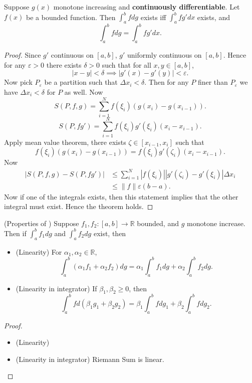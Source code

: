 \begin{theorem}
	Suppose $g(x)$ monotone increasing and \textbf{continuously differentiable}. Let $f(x)$ be a bounded function. Then $\int_a^b f dg $ exists iff $\int_a^b f g' dx$ exists, and 
	\[
		\int_a^b f dg  = \int_a^b f g' dx
	.\] 
\end{theorem}
\begin{proof}
	Since $g'$ continuous on $[a,b]$, $g'$ uniformly continuous on $[a,b]$. Hence for any $\varepsilon>0$ there exists $\delta>0$ such that for all $x, y \in [a,b]$,
	\[
		\left| x - y \right| < \delta \implies
		\left| g'(x) - g'(y) \right| <\varepsilon 
	.\] 
	Now pick $P_\varepsilon$ be a partition such that $\Delta x_i < \delta$. Then for any $P  $ finer than $P_\varepsilon$ we have $\Delta x_i<\delta$ for $P$ as well. Now
	\[
		S(P, f, g) = \sum_{i=1}^{N} f(\xi_i) \left( g(x_i) - g(x_{i-1 }) \right) 
	.\] 
\[
		S(P, fg') = \sum_{i=1}^{N} f(\xi_i)g'(\xi_i) \left( x_i - x_{i-1 } \right) 
	.\]
	Apply mean value theorem, there exists $\zeta \in [x_{i-1 }, x_i]$ such that
	\[
		f(\xi_i)\left( g(x_{i}) - g(x_{i-1 }) \right)  =
		f(\xi_i) g'(\zeta_i) \left( x_i - x_{i-1 } \right) 
	.\] 
	Now
	\begin{align*}
		\left| S(P, f, g) - S(P, fg') \right| 
		&\le \sum_{i=1}^{N} |f(\xi_i)| |g'(\zeta_i) - g'(\xi_i)| \Delta x_i\\
		&\le \|f\| \varepsilon (b-a)
	.\end{align*} 
	Now if one of the integrals exists, then this statement implies that the other integral must exist.
	Hence the theorem holds.
\end{proof}

\begin{proposition}(Properties of )
	Suppose $f_1, f_2: [a,b] \to \mathbb{R}$ bounded, and $g$ monotone increase. Then if $\int_a^b f_1 dg$ and $\int_a^b f_2 dg$ exist, then
	\begin{itemize}
		\item (Linearity) For $\alpha_1, \alpha_2 \in \mathbb{R}$, 
			\[
			\int _a^b \left( \alpha_1f_1+\alpha_2f_2 \right) dg = 
			\alpha_1\int_a^b f_1 dg + \alpha_2\int_a^b f_2 dg
		.\] 
	\item (Linearity in integrator) If $\beta_1, \beta_2\ge 0$, then
\[
			\int _a^b f d(\beta_1g_1+\beta_2g_2) = 
			\beta_1 \int _a^b f dg_1 + \beta_2 \int _a^b f dg_2
		.\]
	\end{itemize}
\end{proposition}
\begin{proof}
	\begin{itemize}
		\item (Linearity)
		\item (Linearity in integrator) Riemann Sum is linear.
	\end{itemize}
\end{proof}

